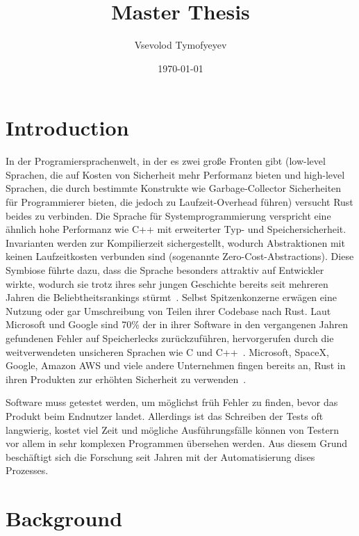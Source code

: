 \documentclass{article}
\begin{document}
\title{Master Thesis}
\author{Vsevolod Tymofyeyev}
\date{\today}
\maketitle

\tableofcontents
\section{Introduction}
In der Programiersprachenwelt, in der es zwei große Fronten gibt (low-level Sprachen, die auf Kosten von Sicherheit mehr Performanz bieten und high-level Sprachen, die durch bestimmte Konstrukte wie Garbage-Collector Sicherheiten für Programmierer bieten, die jedoch zu Laufzeit-Overhead führen) versucht Rust beides zu verbinden. Die Sprache für Systemprogrammierung verspricht eine ähnlich hohe Performanz wie C++ mit erweiterter Typ- und Speichersicherheit. Invarianten werden zur Kompilierzeit sichergestellt, wodurch Abstraktionen mit keinen Laufzeitkosten verbunden sind (sogenannte Zero-Cost-Abstractions). Diese Symbiose führte dazu, dass die Sprache besonders attraktiv auf Entwickler wirkte, wodurch sie trotz ihres sehr jungen Geschichte bereits seit mehreren Jahren die Beliebtheitsrankings stürmt~\cite{StackOverflow2020}. Selbst Spitzenkonzerne erwägen eine Nutzung oder gar Umschreibung von Teilen ihrer Codebase nach Rust. Laut Microsoft und Google sind 70\% der in ihrer Software in den vergangenen Jahren gefundenen Fehler auf Speicherlecks zurückzuführen, hervorgerufen durch die weitverwendeten unsicheren Sprachen wie C und C++~\cite{Microsoft2019MemoryBugs, RustInAndroid}. Microsoft, SpaceX, Google, Amazon AWS und viele andere Unternehmen fingen bereits an, Rust in ihren Produkten zur erhöhten Sicherheit zu verwenden~\cite{MicrosoftJoinsRust, AmazonLovesRust, RustInAndroid, GoogleRustFoundation}. 

 Software muss getestet werden, um möglichst früh Fehler zu finden, bevor das Produkt beim Endnutzer landet. Allerdings ist das Schreiben der Tests oft langwierig, kostet viel Zeit und mögliche Ausführungsfälle können von Testern vor allem in sehr komplexen Programmen übersehen werden. Aus diesem Grund beschäftigt sich die Forschung seit Jahren mit der Automatisierung dises Prozesses. 

\section{Background}
\end{document}
